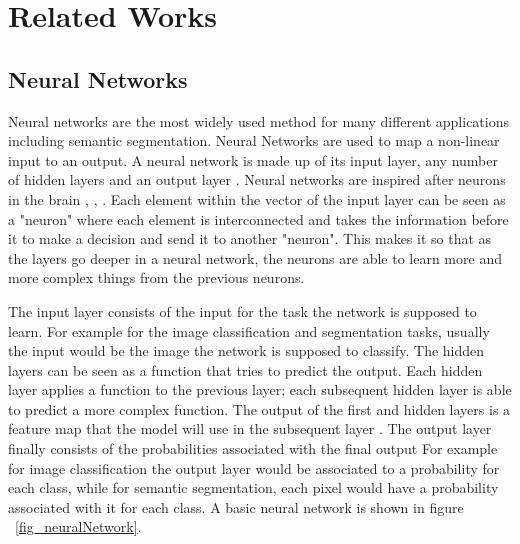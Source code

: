 \chapter{Related Works}


\section{Neural Networks}
    Neural networks are the most widely used method for many different applications including semantic segmentation. 
    Neural Networks are used to map a non-linear input to an output. 
    A neural network is made up of its input layer, any number of hidden layers and an output layer \cite{DeepLearning2015}.
    Neural networks are inspired after neurons in the brain \cite{DeepLearning2015}, \cite{Goodfellow-et-al-2016}, \cite{10.1371/journal.pcbi.Neurons}. 
    Each element within the vector of the input layer can be seen as a "neuron" where each element is interconnected and takes the information before it to make a decision and send it to another "neuron".
    This makes it so that as the layers go deeper in a neural network, the neurons are able to learn more and more complex things from the previous neurons.
    \par
    The input layer consists of the input for the task the network is supposed to learn. 
    For example for the image classification and segmentation tasks, usually the input would be the image the network is supposed to classify. 
    The hidden layers can be seen as a function that tries to predict the output. 
    Each hidden layer applies a function to the previous layer; each subsequent hidden layer is able to predict a more complex function.
    The output of the first and hidden layers is a feature map that the model will use in the subsequent layer \cite{Goodfellow-et-al-2016}. 
    The output layer finally consists of the probabilities associated with the final output 
    For example for image classification the output layer would be associated to a probability for each class, while for semantic segmentation, each pixel would have a probability associated with it for each class. 
    A basic neural network is shown in figure ~\ref{fig_neuralNetwork}. 
    
